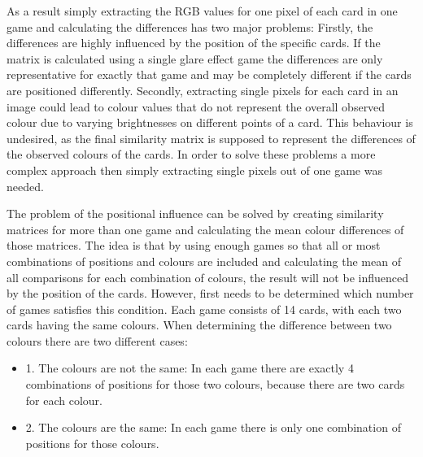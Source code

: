 As a result simply extracting the RGB values for one pixel of each card in one game and calculating the differences has two major problems: Firstly, the differences are highly influenced by the position of the specific cards. If the matrix is calculated using a single glare effect game the differences are only representative for exactly that game and may be completely different if the cards are positioned differently. Secondly, extracting single pixels for each card in an image could lead to colour values that do not represent the overall observed colour due to varying brightnesses on different points of a card. This behaviour is undesired, as the final similarity matrix is supposed to represent the differences of the observed colours of the cards.  In order to solve these problems a more complex approach then simply extracting single pixels out of one game was needed. 

\newpage

The problem of the positional influence can be solved by creating similarity matrices for more than one game and calculating the mean colour differences of those matrices. The idea is that by using enough games so that all or most combinations of positions and colours are included and calculating the mean of all comparisons for each combination of colours, the result will not be influenced by the position of the cards. However, first needs to be determined which number of games satisfies this condition. Each game consists of 14 cards, with each two cards having the same colours. When determining the difference between two colours there are two different cases: 
\begin{itemize}
	\item 1. The colours are not the same: In each game there are exactly 4 combinations of positions for those two colours, because there are two cards for each colour. 
	\item 2. The colours are the same: In each game there is only one combination of positions for those colours.  
\end{itemize}

